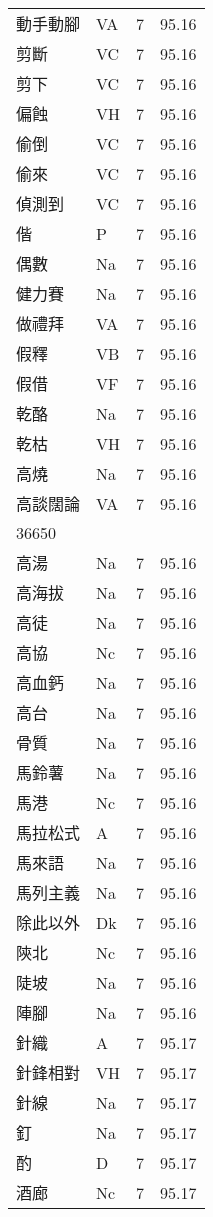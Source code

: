 \documentclass[twocolumn]{book}
\begin{document}
\begin{supertabular}{llrr}
動手動腳 & VA & 7 &  95.16\\
剪斷 & VC & 7 &  95.16\\
剪下 & VC & 7 &  95.16\\
偏蝕 & VH & 7 &  95.16\\
偷倒 & VC & 7 &  95.16\\
偷來 & VC & 7 &  95.16\\
偵測到 & VC & 7 &  95.16\\
偕 & P & 7 &  95.16\\
偶數 & Na & 7 &  95.16\\
健力賽 & Na & 7 &  95.16\\
做禮拜 & VA & 7 &  95.16\\
假釋 & VB & 7 &  95.16\\
假借 & VF & 7 &  95.16\\
乾酪 & Na & 7 &  95.16\\
乾枯 & VH & 7 &  95.16\\
高燒 & Na & 7 &  95.16\\
高談闊論 & VA & 7 &  95.16\\
36650\\
高湯 & Na & 7 &  95.16\\
高海拔 & Na & 7 &  95.16\\
高徒 & Na & 7 &  95.16\\
高協 & Nc & 7 &  95.16\\
高血鈣 & Na & 7 &  95.16\\
高台 & Na & 7 &  95.16\\
骨質 & Na & 7 &  95.16\\
馬鈴薯 & Na & 7 &  95.16\\
馬港 & Nc & 7 &  95.16\\
馬拉松式 & A & 7 &  95.16\\
馬來語 & Na & 7 &  95.16\\
馬列主義 & Na & 7 &  95.16\\
除此以外 & Dk & 7 &  95.16\\
陝北 & Nc & 7 &  95.16\\
陡坡 & Na & 7 &  95.16\\
陣腳 & Na & 7 &  95.16\\
針織 & A & 7 &  95.17\\
針鋒相對 & VH & 7 &  95.17\\
針線 & Na & 7 &  95.17\\
釘 & Na & 7 &  95.17\\
酌 & D & 7 &  95.17\\
酒廊 & Nc & 7 &  95.17\\

\end{supertabular}
\end{document}
